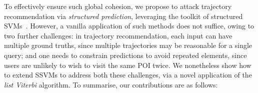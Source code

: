 To effectively %
ensure such global cohesion,
we propose to attack trajectory recommendation
via \emph{structured prediction}, leveraging the toolkit of structured
SVMs~\citep{taskar2004max,tsochantaridis2004support}.
However, a vanilla application of such methods does not suffice,
owing to two further challenges:
in trajectory recommendation,
each input can have multiple ground truths,
since multiple trajectories may be reasonable for a single query;
and %
one needs to constrain predictions to avoid repeated elements, since users are unlikely to wish to visit the same POI twice.
We nonetheless show how to extend SSVMs to address both these challenges,
via a novel application of the \emph{list Viterbi} algorithm.
To summarise, our contributions are as follows:
